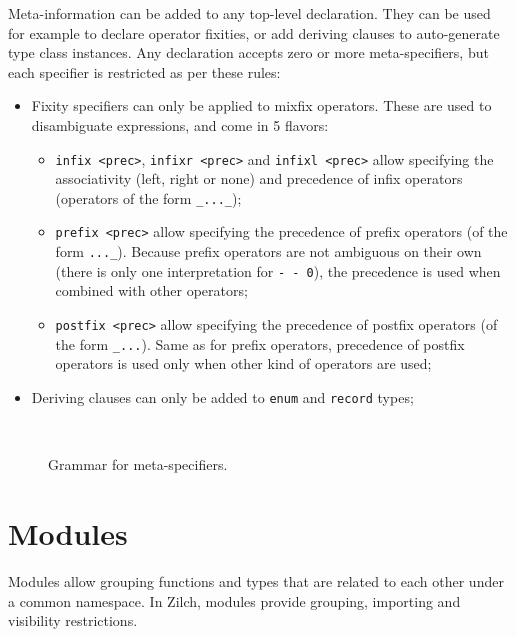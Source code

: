 Meta-information can be added to any top-level declaration.
They can be used for example to declare operator fixities, or add deriving clauses to auto-generate type class instances.
Any declaration accepts zero or more meta-specifiers, but each specifier is restricted as per these rules:
\begin{itemize}
  \item Fixity specifiers can only be applied to mixfix operators.
        These are used to disambiguate expressions, and come in 5 flavors:
        \begin{itemize}
          \item \verb|infix <prec>|, \verb|infixr <prec>| and \verb|infixl <prec>| allow specifying the associativity (left, right or none) and precedence of infix operators (operators of the form \verb|_..._|);
          \item \verb|prefix <prec>| allow specifying the precedence of prefix operators (of the form \verb|..._|).
                Because prefix operators are not ambiguous on their own (there is only one interpretation for \verb|- - 0|), the precedence is used when combined with other operators;
          \item \verb|postfix <prec>| allow specifying the precedence of postfix operators (of the form \verb|_...|).
                Same as for prefix operators, precedence of postfix operators is used only when other kind of operators are used;
        \end{itemize}
  \item Deriving clauses can only be added to \verb|enum| and \verb|record| types;
\end{itemize}

\begin{figure}[H]
  \centering

  \\

  \caption{Grammar for meta-specifiers.}
  \label{fig:zilch-grammar-declarations-meta-grammar}
\end{figure}

\section{Modules}\label{sec:zilch-grammar-modules}

Modules allow grouping functions and types that are related to each other under a common namespace.
In Zilch, modules provide grouping, importing and visibility restrictions.

